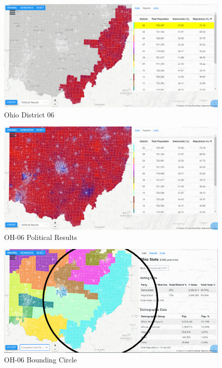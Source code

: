 \documentclass[letterpaper]{article}
\begin{document}
\begin{figure}[H]
	\includegraphics[width=\linewidth]{./figures/OH-06.png}
	\caption{Ohio District 06}
	\label{fig:oh06border}
\end{figure}

\begin{figure}[H]
	\includegraphics[width=\linewidth]{./figures/OH-06-SurroundingArea.png}
	\caption{OH-06 Political Results}
	\label{fig:oh06political}
\end{figure}

\begin{figure}[H]
	\includegraphics[width=\linewidth]{./figures/OH-06-BoundingCircle.png}
	\caption{OH-06 Bounding Circle}
	\label{fig:oh06boundingCircle}
\end{figure}
\end{document}
